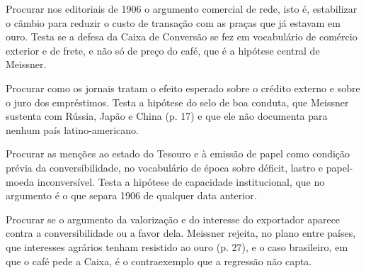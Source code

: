 \begin{dialogo}
\item Procurar nos editoriais de 1906 o argumento comercial de rede, isto é,
estabilizar o câmbio para reduzir o custo de transação com as praças que já
estavam em ouro. Testa se a defesa da Caixa de Conversão se fez em vocabulário
de comércio exterior e de frete, e não só de preço do café, que é a hipótese
central de Meissner.
\item Procurar como os jornais tratam o efeito esperado sobre o crédito externo
e sobre o juro dos empréstimos. Testa a hipótese do selo de boa conduta, que
Meissner sustenta com Rússia, Japão e China (p. 17) e que ele não documenta
para nenhum país latino-americano.
\item Procurar as menções ao estado do Tesouro e à emissão de papel como
condição prévia da conversibilidade, no vocabulário de época sobre déficit,
lastro e papel-moeda inconversível. Testa a hipótese de capacidade
institucional, que no argumento é o que separa 1906 de qualquer data anterior.
\item Procurar se o argumento da valorização e do interesse do exportador
aparece contra a conversibilidade ou a favor dela. Meissner rejeita, no plano
entre países, que interesses agrários tenham resistido ao ouro (p. 27), e o
caso brasileiro, em que o café pede a Caixa, é o contraexemplo que a regressão
não capta.
\end{dialogo}


